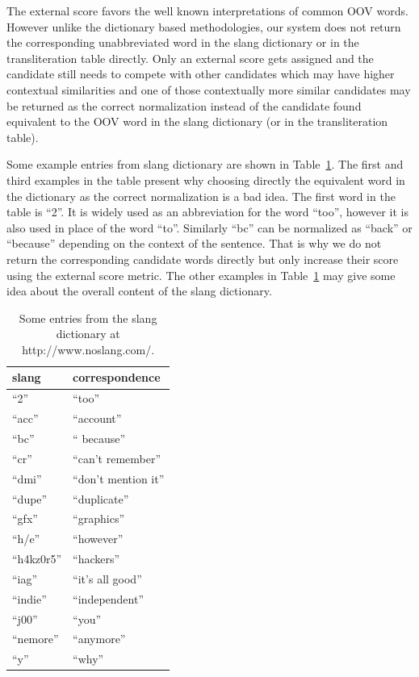 \documentclass[a4paper,onesided,12pt]{report}
\begin{document}
The external score favors the well known interpretations of common OOV words. However unlike the dictionary based methodologies, our system does not return the corresponding unabbreviated word in the slang dictionary or in the transliteration table directly. Only an external score gets assigned and the candidate still needs to compete with other candidates which may have higher contextual similarities and one of those contextually more similar candidates may be returned as the correct normalization instead of the candidate found equivalent to the OOV word in the slang dictionary (or in the transliteration table).

Some example entries from slang dictionary are shown in Table~\ref{tab:slang}. The first and third examples in the table present why choosing directly the equivalent word in the dictionary as the correct normalization is a bad idea. The first word in the table is ``2''. It is widely used as an abbreviation for the word ``too'', however it is also used in place of the word ``to''. Similarly ``bc'' can be normalized as ``back'' or ``because'' depending on the context of the sentence. That is why we do not return the corresponding candidate words directly but only increase their score using the external score metric. The other examples in Table~\ref{tab:slang} may give some idea about the overall content of the slang dictionary.

\begin{table}[ht]
  \caption{Some entries from the slang dictionary at http://www.noslang.com/.}
  \centering
    \begin{tabular}[l]{|l|l|}
    \hline
    \textbf{slang} & \textbf{correspondence} \\\hline
    ``2'' & ``too'' \\\hline
    ``acc'' & ``account'' \\\hline
    ``bc'' & `` because'' \\\hline
    ``cr'' & ``can't remember'' \\\hline
    ``dmi'' & ``don't mention it'' \\\hline
    ``dupe'' & ``duplicate'' \\\hline
    ``gfx'' & ``graphics'' \\\hline
    ``h/e'' & ``however'' \\\hline
    ``h4kz0r5'' & ``hackers'' \\\hline
    ``iag'' & ``it's all good'' \\\hline
    ``indie''  & ``independent'' \\\hline
    ``j00'' & ``you'' \\\hline
    ``nemore'' & ``anymore''  \\\hline
    ``y'' & ``why'' \\\hline
  \end{tabular}
\label{tab:slang}
\end{table}
\end{document}
